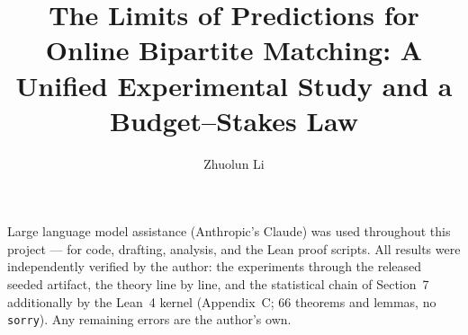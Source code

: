 \documentclass[manuscript,screen,nonacm]{acmart}
\title{The Limits of Predictions for Online Bipartite Matching: A Unified
  Experimental Study and a Budget--Stakes Law}
\author{Zhuolun Li}   %
\affiliation{%
  \institution{University of Bristol}
  \city{Bristol}
  \country{United Kingdom}}
\begin{document}
\maketitle










\appendix


\begin{acks}
Large language model assistance (Anthropic's Claude) was used throughout this project ---
for code, drafting, analysis, and the Lean proof scripts. All results were independently
verified by the author: the experiments through the released seeded artifact, the theory
line by line, and the statistical chain of Section~7 additionally by the Lean~4 kernel
(Appendix~C; 66 theorems and lemmas, no \texttt{sorry}). Any remaining errors are the
author's own.
\end{acks}



\end{document}
